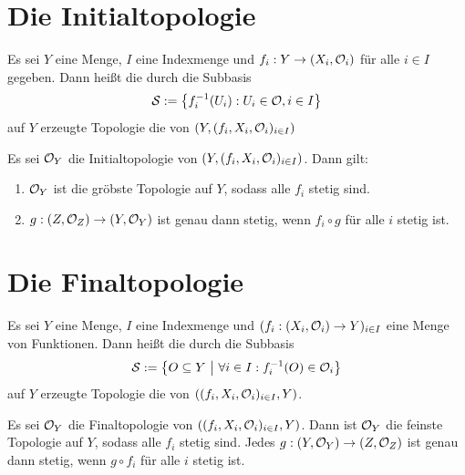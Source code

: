 \documentclass{report}
\begin{document}
\section{Die Initialtopologie}
\begin{definition}
	Es sei $Y$ eine Menge, $I$ eine Indexmenge und $f_i : Y \to (X_i, \mathcal{O}_i)$ für alle $i \in I$ gegeben. Dann heißt die durch die Subbasis
	\begin{align*}
		\mathcal{S} := \qty{f_i^{-1}(U_i) : U_i \in \mathcal{O}, i \in I}
	\end{align*}
	auf $Y$ erzeugte Topologie die  von $(Y, (f_i, X_i, \mathcal{O}_i)_{i \in I})$
\end{definition}
\begin{theorem}
	Es sei $\mathcal{O}_Y$ die Initialtopologie von $(Y, (f_i, X_i, \mathcal{O}_i)_{i \in I})$. Dann gilt:
	 \begin{enumerate}
		\item $\mathcal{O}_Y$ ist die gröbste Topologie auf $Y$, sodass alle $f_i$ stetig sind.
		\item $g : (Z, \mathcal{O}_Z) \to (Y, \mathcal{O}_Y)$ ist genau dann stetig, wenn $f_i \circ g$ für alle $i$ stetig ist.
	\end{enumerate} 
\end{theorem}
\section{Die Finaltopologie}
\begin{definition}
	Es sei $Y$ eine Menge, $I$ eine Indexmenge und $(f_i : (X_i, \mathcal{O}_i) \to Y)_{i \in I}$ eine Menge von Funktionen. Dann heißt die durch die Subbasis
	\begin{align*}
		\mathcal{S} := \qty{O \subseteq Y ~\middle|~\forall i \in I : f_i^{-1}(O) \in \mathcal{O}_i}
	\end{align*}
	auf $Y$ erzeugte Topologie die  von $((f_i, X_i, \mathcal{O}_i)_{i \in I}, Y)$.
\end{definition}
\begin{theorem}
	Es sei $\mathcal{O}_Y$ die Finaltopologie von $\qty((f_i, X_i, \mathcal{O}_i)_{i \in I}, Y)$. Dann ist $\mathcal{O}_Y$ die feinste Topologie auf $Y$, sodass alle $f_i$ stetig sind. Jedes $g : (Y, \mathcal{O}_Y) \to (Z, \mathcal{O}_Z)$ ist genau dann stetig, wenn $g \circ f_i$ für alle $i$ stetig ist.
\end{theorem}
\end{document}
